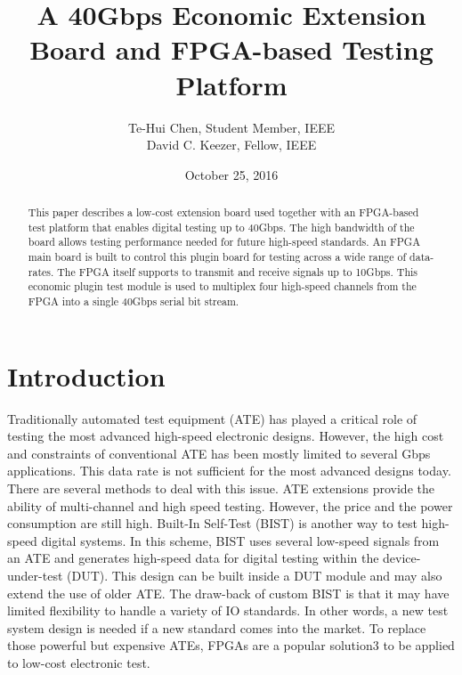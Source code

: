 \documentclass{article}
\title{A 40Gbps Economic Extension Board and FPGA-based Testing Platform}
\author{Te-Hui Chen, Student Member, IEEE\\David C. Keezer, Fellow, IEEE}
\date{October 25, 2016}
\begin{document}
\maketitle

\begin{abstract}
This paper describes a low-cost extension board used together with an FPGA-based test platform that enables digital testing up to 40Gbps. The high bandwidth of the board allows testing performance needed for future high-speed standards. An FPGA main board is built to control this plugin board for testing across a wide range of data-rates. The FPGA itself supports to transmit and receive signals up to 10Gbps. This economic plugin test module is used to multiplex four high-speed channels from the FPGA into a single 40Gbps serial bit stream. 
\end{abstract}

\section{Introduction}
Traditionally automated test equipment (ATE) has played a critical role of testing the most advanced high-speed electronic designs. However, the high cost and constraints of conventional ATE has been mostly limited to several Gbps applications. This data rate is not sufficient for the most advanced designs today. There are several methods to deal with this issue. ATE extensions\cite{bib1} provide the ability of multi-channel and high speed testing. However, the price and the power consumption are still high. Built-In Self-Test (BIST)\cite{bib2} is another way to test high-speed digital systems. In this scheme, BIST uses several low-speed signals from an ATE and generates high-speed data for digital testing within the device-under-test (DUT). This design can be built inside a DUT module and may also extend the use of older ATE. The draw-back of custom BIST is that it may have limited flexibility to handle a variety of IO standards. In other words, a new test system design is needed if a new 
standard comes into the market. To replace those powerful but expensive ATEs, FPGAs are a popular solution\cite{bib3}3 to be applied to low-cost electronic test. 
\end{document}
